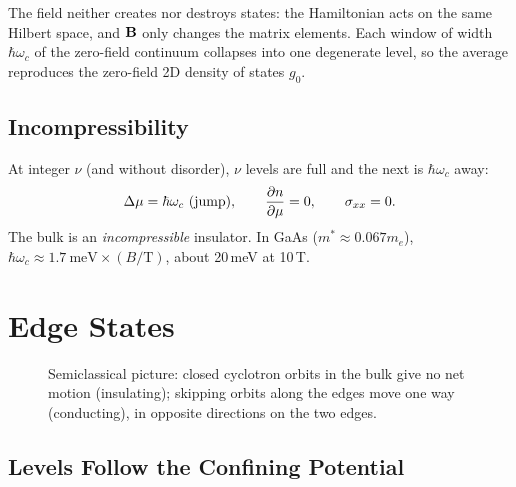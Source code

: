 The field neither creates nor destroys states: the Hamiltonian acts on the same Hilbert space, and $\cvect{B}$ only changes the matrix elements. Each window of width $\hbar\omega_c$ of the zero-field continuum collapses into one degenerate level, so the average reproduces the zero-field 2D density of states $g_0$.

\subsection{Incompressibility}

At integer $\nu$ (and without disorder), $\nu$ levels are full and the next is $\hbar\omega_c$ away:
\begin{equation}
    \Delta\mu = \hbar\omega_c\ \text{(jump)},
    \qquad
    \pdv{n}{\mu} = 0,
    \qquad
    \sigma_{xx} = 0.
\end{equation}
The bulk is an \emph{incompressible} insulator. In GaAs ($m^*\approx0.067m_e$), $\hbar\omega_c\approx1.7\ \text{meV}\times(B/\text{T})$, about 20\,meV at 10\,T.

\section{Edge States}

\begin{figure}[ht]
\centering
{}
\caption{Semiclassical picture: closed cyclotron orbits in the bulk give no net motion (insulating); skipping orbits along the edges move one way (conducting), in opposite directions on the two edges.}
\label{fig:qhe-skipping}
\end{figure}

\subsection{Levels Follow the Confining Potential}

